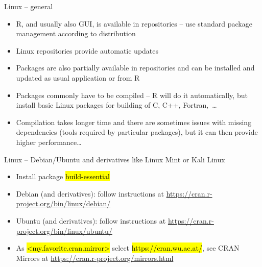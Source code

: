 \documentclass[compress, ucs, xelatex, 11pt, xcolor=svgnames,
  hyperref={
    bookmarks=true,
    unicode=true,
    colorlinks=true,
    pdftitle={Molecular data in R},
    plainpages=false,
    pdfauthor={Vojtech Zeisek},
    pdfsubject={Course about phylogeny and evolution in R},
    pdfcreator={XeLaTeX},
    pdfkeywords={R, evolution, phylogeny, molecular data},
    linkcolor=Tomato,
    anchorcolor=SaddleBrown,
    citecolor=Goldenrod,
    filecolor=DarkMagenta,
    menucolor=Sienna,
    urlcolor=DarkTurquoise,
    pdftex},
  url={hyphens, lowtilde} %
  ]{beamer}
\renewcommand{\texttt}[1]{\hl{\ttfamily #1}}
\begin{document}
\begin{frame}{Linux -- general}
\begin{itemize}
 \item R, and usually also GUI, is available in repositories -- use standard package management according to distribution
 \item Linux repositories provide automatic updates
 \item Packages are also partially available in repositories and can be installed and updated as usual application or from R
 \item Packages commonly have to be compiled -- R will do it automatically, but install basic Linux packages for building of C, C++, Fortran,~\ldots
 \item Compilation takes longer time and there are sometimes issues with missing dependencies (tools required by particular packages), but it can then provide higher performance\ldots
\end{itemize}
\end{frame}

\begin{frame}{Linux -- Debian/Ubuntu and derivatives like Linux Mint or Kali Linux}
\begin{itemize}
 \item Install package \texttt{build-essential}
 \item Debian (and derivatives): follow instructions at \url{https://cran.r-project.org/bin/linux/debian/}
 \item Ubuntu (and derivatives): follow instructions at \url{https://cran.r-project.org/bin/linux/ubuntu/}
 \item As \texttt{<my.favorite.cran.mirror>} select \alert{\texttt{https://cran.wu.ac.at/}}, see \alert{CRAN Mirrors} at \url{https://cran.r-project.org/mirrors.html}
\end{itemize}
\end{frame}
\end{document}
